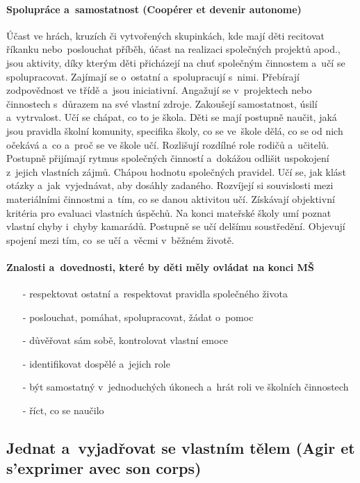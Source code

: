 			\paragraph{Spolupráce a~samostatnost (Coopérer et devenir autonome)}
				Účast ve hrách, kruzích či vytvořených skupinkách, kde mají děti recitovat říkanku nebo poslouchat příběh, účast na realizaci společných projektů apod., jsou aktivity, díky kterým děti přicházejí na chuť společným činnostem a~učí se spolupracovat. Zajímají se o~ostatní a spolupracují s nimi. Přebírají zodpovědnost ve třídě a~jsou iniciativní. Angažují se v projektech nebo činnostech s důrazem na své vlastní zdroje. Zakoušejí samostatnost, úsilí a~vytrvalost. Učí se chápat, co to je škola.
				Děti se mají postupně naučit, jaká jsou pravidla školní komunity, specifika školy, co se ve škole dělá, co se od nich očekává a~co a~proč se ve škole učí. Rozlišují rozdílné role rodičů a~učitelů. 
				Postupně přijímají rytmus společných činností a~dokážou odlišit uspokojení z jejich vlastních zájmů. Chápou hodnotu společných pravidel. Učí se, jak klást otázky a jak vyjednávat, aby dosáhly zadaného. Rozvíjejí si souvislosti mezi materiálními činnostmi a~tím, co se danou aktivitou učí. Získávají objektivní kritéria pro evaluaci vlastních úspěchů. Na konci mateřské školy umí poznat vlastní chyby i~chyby kamarádů. Postupně se učí delšímu soustředění. Objevují spojení mezi tím, co se učí a~věcmi v běžném životě.
			\paragraph{Znalosti a~dovednosti, které by děti měly ovládat na konci MŠ}
			\begin{itemize}
				\setlength\itemsep{-2mm}
				\item[-] respektovat ostatní a~respektovat pravidla společného života
				\item[-] poslouchat, pomáhat, spolupracovat, žádat o~pomoc
				\item[-] důvěřovat sám sobě, kontrolovat vlastní emoce
				\item[-] identifikovat dospělé a~jejich role
				\item[-] být samostatný v jednoduchých úkonech a~hrát roli ve školních činnostech
				\item[-] říct, co se naučilo
				\end{itemize}

		\subsection{Jednat a~vyjadřovat se vlastním tělem (Agir et s'exprimer avec son corps)}

